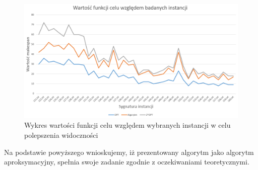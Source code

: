\documentclass[12pt, a4paper]{report}
\begin{document}
  \begin{figure}[H]
    \includegraphics[scale=0.5]{2}
    \centering
    \caption{Wykres wartości funkcji celu względem wybranych instancji w celu polepszenia widoczności}
  \end{figure}
  Na podstawie powyższego wnioskujemy, iż prezentowany algorytm jako algorytm aproksymacyjny, spełnia swoje zadanie zgodnie z oczekiwaniami teoretycznymi.
\end{document}
